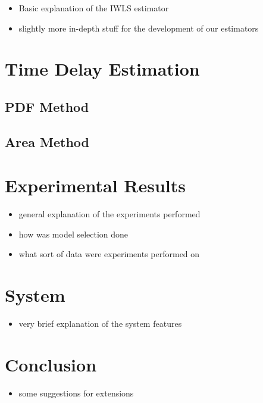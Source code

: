 \documentclass[a4paper,11pt]{article}
\begin{document}
\begin{itemize}
\item Basic explanation of the IWLS estimator
\item slightly more in-depth stuff for the development of our estimators
\end{itemize}
\section{Time Delay Estimation}
\label{sec-5}
\subsection{PDF Method}
\label{sec-5-1}
\subsection{Area Method}
\label{sec-5-2}
\section{Experimental Results}
\label{sec-6}

\begin{itemize}
\item general explanation of the experiments performed
\item how was model selection done
\item what sort of data were experiments performed on
\end{itemize}
\section{System}
\label{sec-7}

\begin{itemize}
\item very brief explanation of the system features
\end{itemize}
\section{Conclusion}
\label{sec-8}

\begin{itemize}
\item some suggestions for extensions
\end{itemize}
\end{document}
